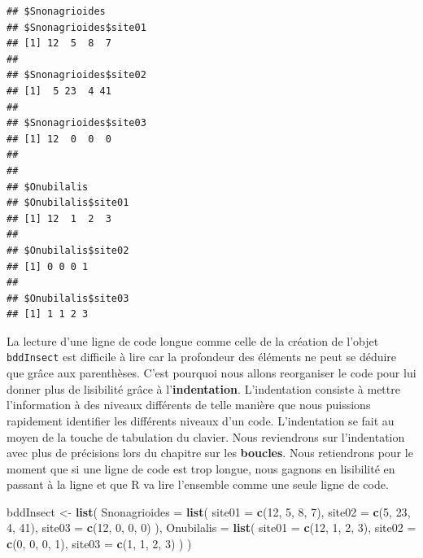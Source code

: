 \documentclass[]{book}
\newenvironment{Shaded}{\begin{snugshade}}{\end{snugshade}}
\newcommand{\DataTypeTok}[1]{\textcolor[rgb]{0.13,0.29,0.53}{#1}}
\newcommand{\DecValTok}[1]{\textcolor[rgb]{0.00,0.00,0.81}{#1}}
\newcommand{\KeywordTok}[1]{\textcolor[rgb]{0.13,0.29,0.53}{\textbf{#1}}}
\newcommand{\NormalTok}[1]{#1}
\newcommand{\StringTok}[1]{\textcolor[rgb]{0.31,0.60,0.02}{#1}}
\begin{document}
\begin{verbatim}
## $Snonagrioides
## $Snonagrioides$site01
## [1] 12  5  8  7
## 
## $Snonagrioides$site02
## [1]  5 23  4 41
## 
## $Snonagrioides$site03
## [1] 12  0  0  0
## 
## 
## $Onubilalis
## $Onubilalis$site01
## [1] 12  1  2  3
## 
## $Onubilalis$site02
## [1] 0 0 0 1
## 
## $Onubilalis$site03
## [1] 1 1 2 3
\end{verbatim}

La lecture d'une ligne de code longue comme celle de la création de l'objet \texttt{bddInsect} est difficile à lire car la profondeur des éléments ne peut se déduire que grâce aux parenthèses. C'est pourquoi nous allons reorganiser le code pour lui donner plus de lisibilité grâce à l'\textbf{indentation}. L'indentation consiste à mettre l'information à des niveaux différents de telle manière que nous puissions rapidement identifier les différents niveaux d'un code. L'indentation se fait au moyen de la touche de tabulation du clavier. Nous reviendrons sur l'indentation avec plus de précisions lors du chapitre sur les \textbf{boucles}. Nous retiendrons pour le moment que si une ligne de code est trop longue, nous gagnons en lisibilité en passant à la ligne et que R va lire l'ensemble comme une seule ligne de code.

\begin{Shaded}
\begin{Highlighting}[]
\NormalTok{bddInsect <-}\StringTok{ }\KeywordTok{list}\NormalTok{(}
  \DataTypeTok{Snonagrioides =} \KeywordTok{list}\NormalTok{(}
    \DataTypeTok{site01 =} \KeywordTok{c}\NormalTok{(}\DecValTok{12}\NormalTok{, }\DecValTok{5}\NormalTok{, }\DecValTok{8}\NormalTok{, }\DecValTok{7}\NormalTok{), }
    \DataTypeTok{site02 =} \KeywordTok{c}\NormalTok{(}\DecValTok{5}\NormalTok{, }\DecValTok{23}\NormalTok{, }\DecValTok{4}\NormalTok{, }\DecValTok{41}\NormalTok{), }
    \DataTypeTok{site03 =} \KeywordTok{c}\NormalTok{(}\DecValTok{12}\NormalTok{, }\DecValTok{0}\NormalTok{, }\DecValTok{0}\NormalTok{, }\DecValTok{0}\NormalTok{)}
\NormalTok{  ), }
  \DataTypeTok{Onubilalis =} \KeywordTok{list}\NormalTok{(}
    \DataTypeTok{site01 =} \KeywordTok{c}\NormalTok{(}\DecValTok{12}\NormalTok{, }\DecValTok{1}\NormalTok{, }\DecValTok{2}\NormalTok{, }\DecValTok{3}\NormalTok{), }
    \DataTypeTok{site02 =} \KeywordTok{c}\NormalTok{(}\DecValTok{0}\NormalTok{, }\DecValTok{0}\NormalTok{, }\DecValTok{0}\NormalTok{, }\DecValTok{1}\NormalTok{), }
    \DataTypeTok{site03 =} \KeywordTok{c}\NormalTok{(}\DecValTok{1}\NormalTok{, }\DecValTok{1}\NormalTok{, }\DecValTok{2}\NormalTok{, }\DecValTok{3}\NormalTok{)}
\NormalTok{  )}
\NormalTok{)}
\end{Highlighting}
\end{Shaded}
\end{document}
